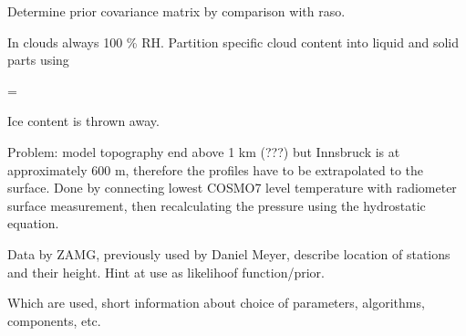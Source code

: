     Determine prior covariance matrix by comparison with raso.

    In clouds always 100 \% RH. Partition specific cloud content into liquid
    and solid parts using

    \startformula
        \QLIQ = \QCLOUD \startcases
              \KELVIN \le \TEMP \NR
            \NC \frac{\TEMP - 233.15 \KELVIN}{40 \KELVIN}
                 \KELVIN \lt \TEMP {} \KELVIN \NR
              \KELVIN \le \TEMP \NR
        \stopcases
    \stopformula

    Ice content is thrown away.

    Problem: model topography end above 1 km (???) but Innsbruck is at
    approximately 600 m, therefore the profiles have to be extrapolated to the
    surface. Done by connecting lowest COSMO7 level temperature with radiometer
    surface measurement, then recalculating the pressure using the hydrostatic
    equation.

            {}

\stopsection


\startsection[title={Nordkette Slope Measurements}]

    Data by ZAMG, previously used by Daniel Meyer, describe location of
    stations and their height. Hint at use as likelihoof function/prior.

\stopsection


\startsection[title={Applied Retrieval techniques}]

    Which are used, short information about choice of parameters, algorithms,
    components, etc.

\stopsection

